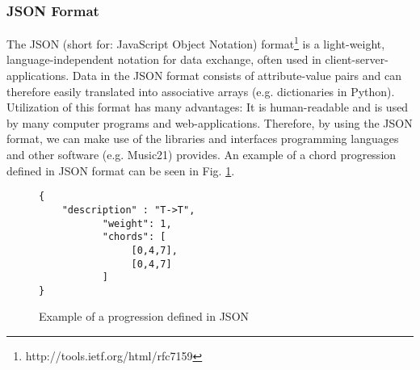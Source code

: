 \subsubsection{JSON Format}
The JSON (short for: JavaScript Object Notation) format\footnote{http://tools.ietf.org/html/rfc7159} is a light-weight, language-independent notation for data exchange, often used in client-server-applications. Data in the JSON format consists of attribute-value pairs and can therefore easily translated into associative arrays (e.g. dictionaries in Python). Utilization of this format has many advantages: It is human-readable and is used by many computer programs and web-applications. Therefore, by using the JSON format, we can make use of the libraries and interfaces programming languages and other software (e.g. Music21) provides. An example of a chord progression defined in JSON format can be seen in Fig. \ref{fig:jsonex}.

\begin{figure}
\centering
\begin{verbatim}
{
	"description" : "T->T",
           "weight": 1,
           "chords": [
                [0,4,7],
                [0,4,7]
           ]
}
\end{verbatim}
\caption{Example of a progression defined in JSON}
\label{fig:jsonex}
\end{figure}